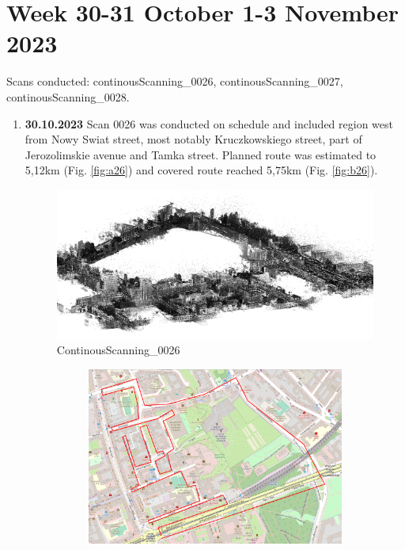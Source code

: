\documentclass[a4paper,12pt]{book}
\begin{document}
\section{Week 30-31 October 1-3 November 2023}
Scans conducted: continousScanning\_0026, continousScanning\_0027, continousScanning\_0028.\\
\begin{enumerate}
	\item \textbf{30.10.2023} Scan 0026 was conducted on schedule and included region west from Nowy Swiat street, most notably Kruczkowskiego street, part of Jerozolimskie avenue and Tamka street. Planned route was estimated to 5,12km (Fig. \ref{fig:a26}) and covered route reached 5,75km (Fig. \ref{fig:b26}).
	\begin{figure}[H]
		\includegraphics[width=1\linewidth]{cloud26}
		\caption{ContinousScanning\_0026}
	\end{figure}
	\begin{figure}[H]
		\centering
		\begin{subfigure}{.95\textwidth}
			\centering
			\includegraphics[width=1\linewidth]{route_p26}

\end{subfigure}
\end{figure}
\end{enumerate}
\end{document}
